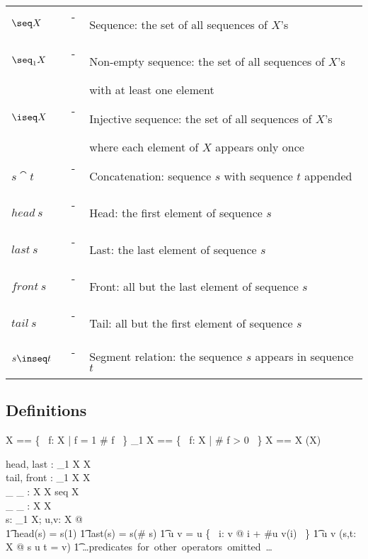 \documentclass{article}
\begin{document}
\begin{tabular}{l c l}
$\seq X$ & ~-~ & Sequence: the set of all sequences of $X$'s \\
$\seq_1 X$ & ~-~ & Non-empty sequence: the set of all sequences of $X$'s \\
	&  & with at least one element \\
$\iseq X$ & ~-~ & Injective sequence: the set of all sequences of $X$'s \\
	&  & where each element of $X$ appears only once \\
$s \cat t$ & ~-~ & Concatenation: sequence $s$ with sequence $t$ appended \\
$head~s$ & ~-~ & Head: the first element of sequence $s$ \\
$last~s$ & ~-~ & Last: the last element of sequence $s$ \\
$front~s$ & ~-~ & Front: all but the last element of sequence $s$ \\
$tail~s$ & ~-~ & Tail: all but the first element of sequence $s$ \\
$s \inseq t$ & ~-~ & Segment relation: the sequence $s$ appears in sequence $t$
\end{tabular}

\subsection*{Definitions}

\begin{zed}
	\seq X == \{~ f: \nat \ffun X | \dom f = 1 \upto \# f ~\}
\also
	\seq_1 X == \{~ f: \seq X | \# f > 0 ~\}
\also
	\iseq X == \seq X \cap (\nat \pinj X)
\end{zed}

\begin{gendef}[X]
	head, last : \seq_1 X \fun X \\
	tail, front : \seq_1 X \fun \seq X \\
	\_ \cat \_ : \seq X \cross \seq X \fun seq X \\
	\_ \inseq \_ : \seq X \rel \seq X \\
\where
	\forall s: \seq_1 X; u,v: \seq X @ \\
\also 
\t1	head(s) = s(1) \land
\also
\t1	last(s) = s(\# s) \land
\also
\t1	u \cat v = u \cup \{~ i: \dom v @ i + \#u \mapsto v(i) ~\}
\also
\t1	u \inseq v \iff (\exists s,t: \seq X @ s \cat u \cat t = v) 
\also
\t1	\mbox{\dots predicates for other operators omitted \dots}
\also
\end{gendef}
\end{document}
